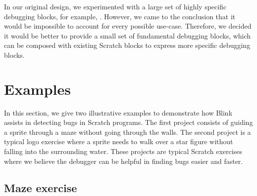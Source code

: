 \documentclass[../main]{subfiles}
\begin{document}
In our original design, we experimented with a large set of highly specific debugging blocks, for example, .
However, we came to the conclusion that it would be impossible to account for every possible use-case.
Therefore, we decided it would be better to provide a small set of fundamental debugging blocks, which can be composed with existing Scratch blocks to express more specific debugging blocks.

\section{Examples}\label{sec:blink-illustrative-examples}

In this section, we give two illustrative examples to demonstrate how Blink assists in detecting bugs in Scratch programs.
The first project consists of guiding a sprite through a maze without going through the walls.
The second project is a typical logo exercise where a sprite needs to walk over a star figure without falling into the surrounding water.
These projects are typical Scratch exercises where we believe the debugger can be helpful in finding bugs easier and faster.

\subsection{Maze exercise}\label{subsec:maze-exercise}
\end{document}
